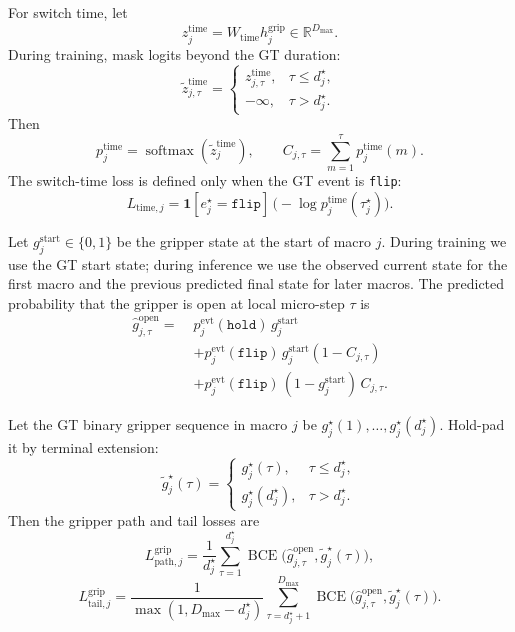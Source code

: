 \documentclass[10pt,twocolumn,letterpaper]{article}
\begin{document}
For switch time, let
\begin{equation}
z_j^{\mathrm{time}} = W_{\mathrm{time}}h_j^{\mathrm{grip}} \in \mathbb{R}^{D_{\max}}.
\end{equation}
During training, mask logits beyond the GT duration:
\begin{equation}
\widetilde z_{j,\tau}^{\mathrm{time}} =
\begin{cases}
z_{j,\tau}^{\mathrm{time}}, & \tau\le d_j^{\star},\\
-\infty, & \tau>d_j^{\star}.
\end{cases}
\end{equation}
Then
\begin{equation}
p_j^{\mathrm{time}} = \operatorname{softmax}(\widetilde z_j^{\mathrm{time}}),
\qquad
C_{j,\tau}=\sum_{m=1}^{\tau}p_j^{\mathrm{time}}(m).
\end{equation}
The switch-time loss is defined only when the GT event is \texttt{flip}:
\begin{equation}
L_{\mathrm{time},j} = \mathbf{1}[e_j^{\star}=\texttt{flip}]\,\bigl(-\log p_j^{\mathrm{time}}(\tau_j^{\star})\bigr).
\end{equation}

Let $g_j^{\mathrm{start}}\in\{0,1\}$ be the gripper state at the start of macro $j$. During training we use the GT start state; during inference we use the observed current state for the first macro and the previous predicted final state for later macros. The predicted probability that the gripper is open at local micro-step $\tau$ is
\begin{align}
\hat g_{j,\tau}^{\mathrm{open}}
=\;& p_j^{\mathrm{evt}}(\texttt{hold})\,g_j^{\mathrm{start}} \nonumber\\
&+ p_j^{\mathrm{evt}}(\texttt{flip})\,g_j^{\mathrm{start}}(1-C_{j,\tau}) \nonumber\\
&+ p_j^{\mathrm{evt}}(\texttt{flip})\,(1-g_j^{\mathrm{start}})\,C_{j,\tau}.
\end{align}

Let the GT binary gripper sequence in macro $j$ be $g_j^{\star}(1),\dots,g_j^{\star}(d_j^{\star})$. Hold-pad it by terminal extension:
\begin{equation}
\widetilde g_j^{\star}(\tau)=
\begin{cases}
g_j^{\star}(\tau), & \tau\le d_j^{\star},\\
g_j^{\star}(d_j^{\star}), & \tau>d_j^{\star}.
\end{cases}
\end{equation}
Then the gripper path and tail losses are
\begin{equation}
L_{\mathrm{path},j}^{\mathrm{grip}} =
\frac{1}{d_j^{\star}}\sum_{\tau=1}^{d_j^{\star}}
\operatorname{BCE}\bigl(\hat g_{j,\tau}^{\mathrm{open}},\widetilde g_j^{\star}(\tau)\bigr),
\end{equation}
\begin{equation}
L_{\mathrm{tail},j}^{\mathrm{grip}} =
\frac{1}{\max(1,D_{\max}-d_j^{\star})}\sum_{\tau=d_j^{\star}+1}^{D_{\max}}
\operatorname{BCE}\bigl(\hat g_{j,\tau}^{\mathrm{open}},\widetilde g_j^{\star}(\tau)\bigr).
\end{equation}
\end{document}
